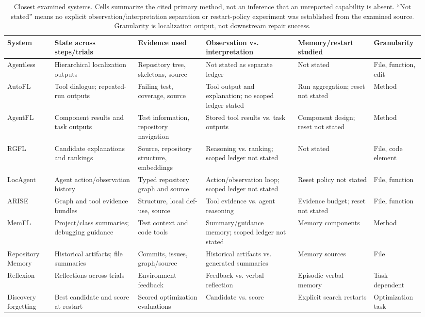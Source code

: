 \documentclass[letterpaper,journal]{IEEEtran}
\begin{document}
\begin{table}[t]
\caption{Closest examined systems. Cells summarize the cited primary method, not an inference that an unreported capability is absent. ``Not stated'' means no explicit observation/interpretation separation or restart-policy experiment was established from the examined source. Granularity is localization output, not downstream repair success.}\label{tab:closest}
\centering\scriptsize\setlength{\tabcolsep}{2.5pt}
\begin{tabular}{@{}p{}p{}p{}p{}p{}p{}@{}}\toprule
System & State across steps/trials & Evidence used & Observation vs. interpretation & Memory/restart studied & Granularity\\\midrule
Agentless~\cite{agentless2025} & Hierarchical localization outputs & Repository tree, skeletons, source & Not stated as separate ledger & Not stated & File, function, edit\\
AutoFL~\cite{autofl2024} & Tool dialogue; repeated-run outputs & Failing test, coverage, source & Tool output and explanation; no scoped ledger stated & Run aggregation; reset not stated & Method\\
AgentFL~\cite{agentfl2024} & Component results and task outputs & Test information, repository navigation & Stored tool results vs. task outputs & Component design; reset not stated & Method\\
RGFL~\cite{rgfl2026} & Candidate explanations and rankings & Source, repository structure, embeddings & Reasoning vs. ranking; scoped ledger not stated & Not stated & File, code element\\
LocAgent~\cite{locagent2025} & Agent action/observation history & Typed repository graph and source & Action/observation loop; scoped ledger not stated & Reset policy not stated & File, function\\
ARISE~\cite{arise2026} & Graph and tool evidence bundles & Structure, local def-use, source & Tool evidence vs. agent reasoning & Evidence budget; reset not stated & File, function\\
MemFL~\cite{memfl2025} & Project/class summaries; debugging guidance & Test context and code tools & Summary/guidance memory; scoped ledger not stated & Memory components & Method\\
Repository Memory~\cite{repomem2026} & Historical artifacts; file summaries & Commits, issues, graph/source & Historical artifacts vs. generated summaries & Memory sources & File\\
Reflexion~\cite{reflexion2023} & Reflections across trials & Environment feedback & Feedback vs. verbal reflection & Episodic verbal memory & Task-dependent\\
Discovery forgetting~\cite{forgetting2026} & Best candidate and score at restart & Scored optimization evaluations & Candidate vs. score & Explicit search restarts & Optimization task\\
\bottomrule\end{tabular}
\end{table}
\end{document}
